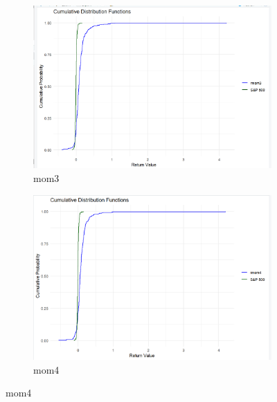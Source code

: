 \documentclass{article}
\begin{document}
\begin{figure}[H]
    \begin{subfigure}{0.45\textwidth}
        \centering
        \includegraphics[width=\textwidth]{27.png}
        \caption{mom3}
        \label{fig:image27}
    \end{subfigure}
    \hspace{0.05\textwidth}
    \begin{subfigure}{0.45\textwidth}
        \centering
        \includegraphics[width=\textwidth]{28.png}
        \caption{mom4}
        \label{fig:image28}
    \end{subfigure}


\end{figure}
\end{document}
